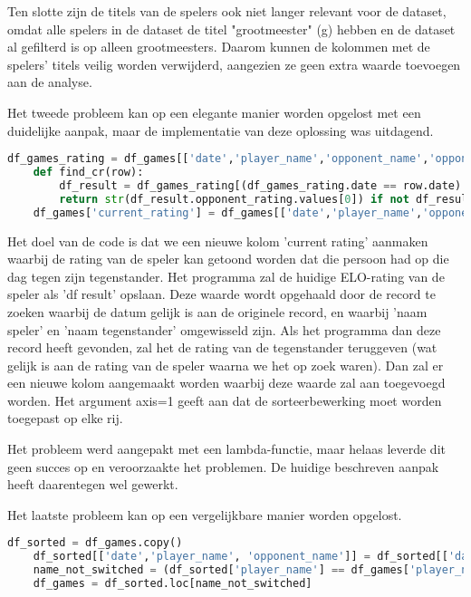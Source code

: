Ten slotte zijn de titels van de spelers ook niet langer relevant voor de dataset, omdat alle spelers in de dataset de titel "grootmeester" (g) hebben en de dataset al gefilterd is op alleen grootmeesters. Daarom kunnen de kolommen met de spelers' titels veilig worden verwijderd, aangezien ze geen extra waarde toevoegen aan de analyse.

Het tweede probleem kan op een elegante manier worden opgelost met een duidelijke aanpak, maar de implementatie van deze oplossing was uitdagend.

\begin{lstlisting}[language=Python]
    df_games_rating = df_games[['date','player_name','opponent_name','opponent_rating']]
    def find_cr(row):
        df_result = df_games_rating[(df_games_rating.date == row.date) & (df_games_rating.player_name == row.opponent_name) & (df_games_rating.opponent_name == row.player_name)]
        return str(df_result.opponent_rating.values[0]) if not df_result.empty else ''
    df_games['current_rating'] = df_games[['date','player_name','opponent_name','opponent_rating']].apply(find_cr, axis=1)
\end{lstlisting}

Het doel van de code is dat we een nieuwe kolom 'current rating' aanmaken waarbij de rating van de speler kan getoond worden dat die persoon had op die dag tegen zijn tegenstander. Het programma zal de huidige ELO-rating van de speler als 'df result' opslaan. Deze waarde wordt opgehaald door de record te zoeken waarbij de datum gelijk is aan de originele record, en waarbij 'naam speler' en 'naam tegenstander' omgewisseld zijn. Als het programma dan deze record heeft gevonden, zal het de rating van de tegenstander teruggeven (wat gelijk is aan de rating van de speler waarna we het op zoek waren). Dan zal er een nieuwe kolom aangemaakt worden waarbij deze waarde zal aan toegevoegd worden. Het argument axis=1 geeft aan dat de sorteerbewerking moet worden toegepast op elke rij. 

Het probleem werd aangepakt met een lambda-functie, maar helaas leverde dit geen succes op en veroorzaakte het problemen. De huidige beschreven aanpak heeft daarentegen wel gewerkt.

Het laatste probleem kan op een vergelijkbare manier worden opgelost.

\begin{lstlisting}[language=Python]
    df_sorted = df_games.copy()
    df_sorted[['date','player_name', 'opponent_name']] = df_sorted[['date','player_name', 'opponent_name']].apply(sorted, axis=1, result_type='expand')
    name_not_switched = (df_sorted['player_name'] == df_games['player_name'])
    df_games = df_sorted.loc[name_not_switched]
\end{lstlisting}

